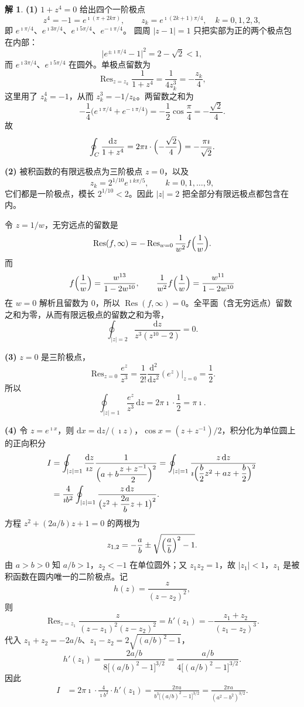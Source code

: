 \documentclass[11pt]{article}
\newcommand{\Res}{\operatorname{Res}}
\theoremstyle{remark}
\theoremstyle{definition}
\newtheorem{solution}{解}
\begin{document}
\begin{solution}
\textbf{(1)}
$1+z^{4}=0$ 给出四个一阶极点
\[
z^{4}=-1=e^{\imath(\pi+2k\pi)},\qquad
z_{k}=e^{\imath(2k+1)\pi/4},\quad k=0,1,2,3,
\]
即 $e^{\imath\pi/4}$、$e^{\imath 3\pi/4}$、$e^{\imath 5\pi/4}$、$e^{-\imath\pi/4}$。
圆周 $|z-1|=1$ 只把实部为正的两个极点包在内部：
\[
\bigl|e^{\pm\imath\pi/4}-1\bigr|^{2}=2-\sqrt{2}<1,
\]
而 $e^{\imath 3\pi/4}$、$e^{\imath 5\pi/4}$ 在圆外。单极点留数为
\[
\Res_{z=z_{k}}\frac{1}{1+z^{4}}
=\frac{1}{4z_{k}^{3}}
=-\frac{z_{k}}{4},
\]
这里用了 $z_{k}^{4}=-1$，从而 $z_{k}^{3}=-1/z_{k}$。两留数之和为
\[
-\frac14\bigl(e^{\imath\pi/4}+e^{-\imath\pi/4}\bigr)
=-\frac12\cos\frac{\pi}{4}
=-\frac{\sqrt{2}}{4}.
\]
故
\[
\oint_{C}\frac{\mathrm{d}z}{1+z^{4}}
=2\pi\imath\cdot\Bigl(-\frac{\sqrt{2}}{4}\Bigr)
=-\frac{\pi\imath}{\sqrt{2}}.
\]

\textbf{(2)}
被积函数的有限远极点为三阶极点 $z=0$，以及
\[
z_{k}=2^{1/10}e^{\imath k\pi/5},\qquad k=0,1,\ldots,9,
\]
它们都是一阶极点，模长 $2^{1/10}<2$。因此 $|z|=2$ 把全部分有限远极点都包含在内。

令 $z=1/w$，无穷远点的留数是
\[
\Res(f,\infty)
=-\Res_{w=0}\frac{1}{w^{2}}f\Bigl(\frac{1}{w}\Bigr).
\]
而
\[
f\Bigl(\frac{1}{w}\Bigr)
=\frac{w^{13}}{1-2w^{10}},
\qquad
\frac{1}{w^{2}}f\Bigl(\frac{1}{w}\Bigr)
=\frac{w^{11}}{1-2w^{10}}
\]
在 $w=0$ 解析且留数为 $0$，所以 $\Res(f,\infty)=0$。全平面（含无穷远点）留数之和为零，从而有限远极点的留数之和为零，
\[
\oint_{|z|=2}\frac{\mathrm{d}z}{z^{3}(z^{10}-2)}=0.
\]

\textbf{(3)}
$z=0$ 是三阶极点，
\[
\Res_{z=0}\frac{e^{z}}{z^{3}}
=\frac{1}{2!}\frac{\mathrm{d}^{2}}{\mathrm{d}z^{2}}(e^{z})\bigg|_{z=0}
=\frac12.
\]
所以
\[
\oint_{|z|=1}\frac{e^{z}}{z^{3}}\,\mathrm{d}z
=2\pi\imath\cdot\frac12
=\pi\imath.
\]

\textbf{(4)}
令 $z=e^{\imath x}$，则 $\mathrm{d}x=\mathrm{d}z/(\imath z)$，$\cos x=(z+z^{-1})/2$，积分化为单位圆上的正向积分
\begin{align*}
I
&=\oint_{|z|=1}\frac{\mathrm{d}z}{\imath z}
\frac{1}{\Bigl(a+b\dfrac{z+z^{-1}}{2}\Bigr)^{2}}
=\oint_{|z|=1}\frac{z\,\mathrm{d}z}{\imath\Bigl(\dfrac{b}{2}z^{2}+az+\dfrac{b}{2}\Bigr)^{2}}\\
&=\frac{4}{\imath b^{2}}\oint_{|z|=1}
\frac{z\,\mathrm{d}z}{\bigl(z^{2}+\dfrac{2a}{b}z+1\bigr)^{2}}.
\end{align*}
方程 $z^{2}+(2a/b)z+1=0$ 的两根为
\[
z_{1,2}
=-\frac{a}{b}\pm\sqrt{\Bigl(\frac{a}{b}\Bigr)^{2}-1}.
\]
由 $a>b>0$ 知 $a/b>1$，$z_{2}<-1$ 在单位圆外；又 $z_{1}z_{2}=1$，故 $|z_{1}|<1$，$z_{1}$ 是被积函数在圆内唯一的二阶极点。记
\[
h(z)=\frac{z}{(z-z_{2})^{2}},
\]
则
\[
\Res_{z=z_{1}}\frac{z}{(z-z_{1})^{2}(z-z_{2})^{2}}
=h'(z_{1})
=-\frac{z_{1}+z_{2}}{(z_{1}-z_{2})^{3}}.
\]
代入 $z_{1}+z_{2}=-2a/b$、$z_{1}-z_{2}=2\sqrt{(a/b)^{2}-1}$，
\[
h'(z_{1})
=\frac{2a/b}{8\bigl[(a/b)^{2}-1\bigr]^{3/2}}
=\frac{a/b}{4\bigl[(a/b)^{2}-1\bigr]^{3/2}}.
\]
因此
\begin{align*}
I
&=2\pi\imath\cdot\frac{4}{\imath b^{2}}\cdot h'(z_{1})
=\frac{2\pi a}{b^{3}\bigl[(a/b)^{2}-1\bigr]^{3/2}}
=\frac{2\pi a}{(a^{2}-b^{2})^{3/2}}.
\end{align*}


\end{solution}
\end{document}
